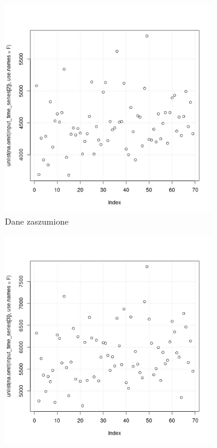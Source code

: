 \documentclass[11pt]{report}
\begin{document}
\begin{figure}[H]
    \begin{subfigure}{.5\textwidth}
        \centering
        \includegraphics[width=.9\linewidth]{plot2.png}
        \caption{Dane zaszumione}
        \label{fig:sfig1}
    \end{subfigure}
    \begin{subfigure}{.5\textwidth}
        \centering
        \includegraphics[width=.9\linewidth]{plot3.png}

\end{subfigure}
\end{figure}
\end{document}

